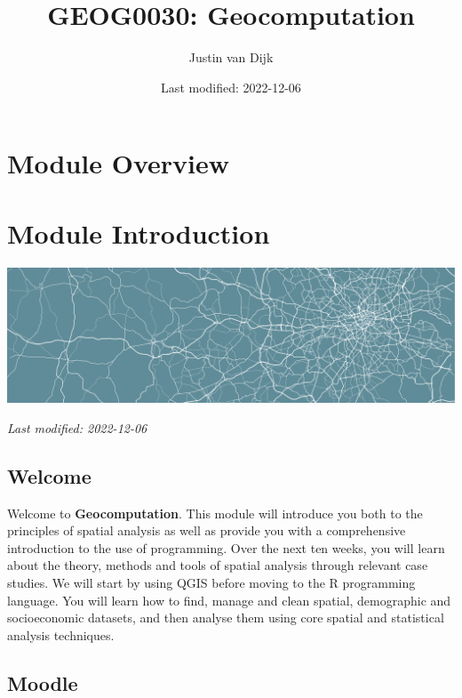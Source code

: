 \documentclass[
]{book}
\title{GEOG0030: Geocomputation}
\author{Justin van Dijk}
\date{Last modified: 2022-12-06}
\begin{document}
\maketitle

{
\setcounter{tocdepth}{1}
\tableofcontents
}
\hypertarget{module-overview}{%
\chapter*{Module Overview}\label{module-overview}}

\hypertarget{module-introduction}{%
\chapter*{Module Introduction}\label{module-introduction}}

\begin{center}\includegraphics[width=1\linewidth]{images/general/geocomputation_welcome} \end{center}

\emph{Last modified: 2022-12-06}

\hypertarget{welcome}{%
\section*{Welcome}\label{welcome}}

Welcome to \textbf{Geocomputation}. This module will introduce you both to the principles of spatial analysis as well as provide you with a comprehensive introduction to the use of programming. Over the next ten weeks, you will learn about the theory, methods and tools of spatial analysis through relevant case studies. We will start by using QGIS before moving to the R programming language. You will learn how to find, manage and clean spatial, demographic and socioeconomic datasets, and then analyse them using core spatial and statistical analysis techniques.

\hypertarget{moodle}{%
\section*{Moodle}\label{moodle}}
\end{document}
